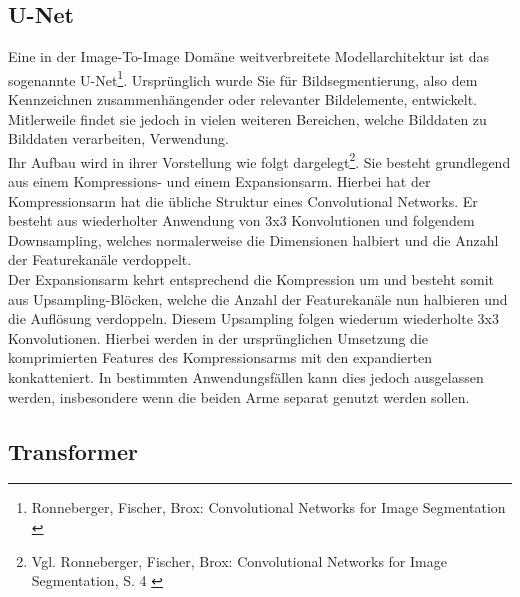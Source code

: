 


\subsection{U-Net}
\label{subsec:Unet}

Eine in der Image-To-Image Domäne weitverbreitete Modellarchitektur ist das  sogenannte U-Net\footnote{
    Ronneberger, Fischer, Brox: Convolutional Networks for Image Segmentation
    \cite{ronneberger2015unetconvolutionalnetworksbiomedical}
}. Ursprünglich wurde Sie für Bildsegmentierung, also dem Kennzeichnen zusammenhängender oder relevanter Bildelemente, entwickelt. Mitlerweile findet sie jedoch in vielen weiteren Bereichen, welche Bilddaten zu Bilddaten verarbeiten, Verwendung. \\
Ihr Aufbau wird in ihrer Vorstellung wie folgt dargelegt\footnote{
    Vgl. Ronneberger, Fischer, Brox: Convolutional Networks for Image Segmentation, S. 4
    \cite{ronneberger2015unetconvolutionalnetworksbiomedical}
}. Sie besteht grundlegend aus einem Kompressions- und einem Expansionsarm. Hierbei hat der Kompressionsarm hat die übliche Struktur eines Convolutional Networks. Er besteht aus wiederholter Anwendung von 3x3 Konvolutionen und folgendem Downsampling, welches normalerweise die Dimensionen halbiert und die Anzahl der Featurekanäle verdoppelt. \\
Der Expansionsarm kehrt entsprechend die Kompression um und besteht somit aus Upsampling-Blöcken, welche die Anzahl der Featurekanäle nun halbieren und die Auflösung verdoppeln. Diesem Upsampling folgen wiederum wiederholte 3x3 Konvolutionen. Hierbei werden in der ursprünglichen Umsetzung die komprimierten Features des Kompressionsarms mit den expandierten konkatteniert. In bestimmten Anwendungsfällen kann dies jedoch ausgelassen werden, insbesondere wenn die beiden Arme separat genutzt werden sollen. 

\subsection{Transformer}


